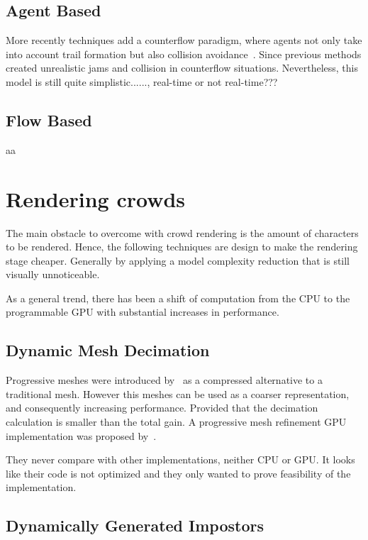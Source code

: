 \documentclass[11pt,twocolumn]{article}
\numberwithin{equation}{section} %
\numberwithin{figure}{section} %
\numberwithin{table}{section} %
\begin{document}
\subsection{Agent Based}

More recently techniques add a counterflow paradigm, where agents not only take into account trail formation but also collision avoidance~\cite{heliovaara2012}.
Since previous methods created unrealistic jams and collision in counterflow situations.
Nevertheless, this model is still quite simplistic......, real-time or not real-time???

\subsection{Flow Based}

aa

\section{Rendering crowds}

The main obstacle to overcome with crowd rendering is the amount of characters to be rendered.
Hence, the following techniques are design to make the rendering stage cheaper.
Generally by applying a model complexity reduction that is still visually unnoticeable.

As a general trend, there has been a shift of computation from the CPU to the programmable GPU with substantial increases in performance.

\subsection{Dynamic Mesh Decimation}

Progressive meshes were introduced by~\cite{Hoppe1996} as a compressed alternative to a traditional mesh.
However this meshes can be used as a coarser representation, and consequently increasing performance.
Provided that the decimation calculation is smaller than the total gain.
A progressive mesh refinement GPU implementation was proposed by~\cite{Hu2009}.

They never compare with other implementations, neither CPU or GPU.
It looks like their code is not optimized and they only wanted to prove feasibility of the implementation. 

\subsection{Dynamically Generated Impostors}
\label{subsec:DimGenImpostors}
\end{document}
